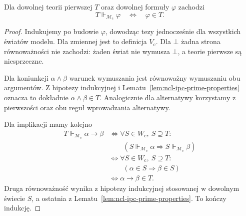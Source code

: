 \begin{twierdzenie}
\label{thm:ncl-ipc-truth-lemma}
Dla dowolnej teorii pierwszej $T$ oraz dowolnej
formuły $\varphi$ zachodzi
\[
 T\Vdash_{\mathcal M_{\mathrm c}}\varphi
 \quad\Longleftrightarrow\quad \varphi\in T.
\]
\end{twierdzenie}
\begin{proof}
Indukujemy po budowie $\varphi$, dowodząc tezy
jednocześnie dla wszystkich światów modelu.
Dla zmiennej jest to definicja $V_{\mathrm c}$.
Dla $\bot$ żadna strona równoważności nie zachodzi:
żaden świat nie wymusza $\bot$, a teorie pierwsze
są niesprzeczne.

Dla koniunkcji $\alpha\wedge\beta$ warunek
wymuszania jest równoważny wymuszaniu obu
argumentów. Z hipotezy indukcyjnej i
Lematu~\ref{lem:ncl-ipc-prime-properties} oznacza to
dokładnie $\alpha\wedge\beta\in T$.
Analogicznie dla alternatywy korzystamy z pierwszości
oraz obu reguł wprowadzania alternatywy.

Dla implikacji mamy kolejno
\[
\begin{aligned}
 T\Vdash_{\mathcal M_{\mathrm c}}\alpha\to\beta
 &\iff \forall S\in W_{\mathrm c},\ S\supseteq T:\\
 &\qquad (S\Vdash_{\mathcal M_{\mathrm c}}\alpha
       \Longrightarrow S\Vdash_{\mathcal M_{\mathrm c}}\beta)\\
 &\iff \forall S\in W_{\mathrm c},\ S\supseteq T:\\
 &\qquad (\alpha\in S\Longrightarrow\beta\in S)\\
 &\iff \alpha\to\beta\in T.
\end{aligned}
\]
Druga równoważność wynika z hipotezy indukcyjnej
stosowanej w dowolnym świecie $S$, a ostatnia
z Lematu~\ref{lem:ncl-ipc-prime-properties}.
To kończy indukcję.
\end{proof}

